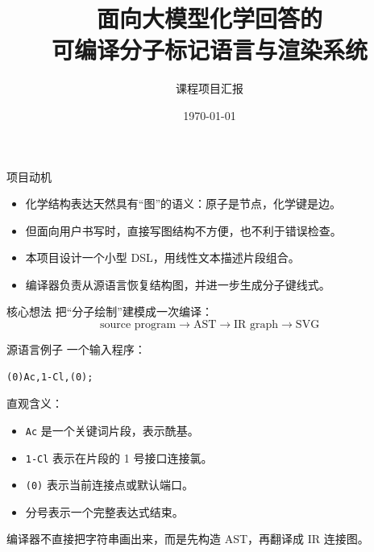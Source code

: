 \documentclass{beamer}
\title{面向大模型化学回答的\\可编译分子标记语言与渲染系统}
\author{课程项目汇报}
\institute{Compiler Project}
\date{\today}
\begin{document}
\begin{frame}
    \titlepage
\end{frame}

\begin{frame}{项目动机}
    \begin{itemize}
        \item 化学结构表达天然具有“图”的语义：原子是节点，化学键是边。
        \item 但面向用户书写时，直接写图结构不方便，也不利于错误检查。
        \item 本项目设计一个小型 DSL，用线性文本描述片段组合。
        \item 编译器负责从源语言恢复结构图，并进一步生成分子键线式。
    \end{itemize}

    \vspace{0.5em}
    \begin{block}{核心想法}
        把“分子绘制”建模成一次编译：
        \[
            \text{source program} \rightarrow \text{AST} \rightarrow \text{IR graph} \rightarrow \text{SVG}
        \]
    \end{block}
\end{frame}

\begin{frame}[fragile]{源语言例子}
    一个输入程序：
    \begin{lstlisting}
(0)Ac,1-Cl,(0);
    \end{lstlisting}

    直观含义：
    \begin{itemize}
        \item \texttt{Ac} 是一个关键词片段，表示酰基。
        \item \texttt{1-Cl} 表示在片段的 1 号接口连接氯。
        \item \texttt{(0)} 表示当前连接点或默认端口。
        \item 分号表示一个完整表达式结束。
    \end{itemize}

    \vspace{0.4em}
    编译器不直接把字符串画出来，而是先构造 AST，再翻译成 IR 连接图。
\end{frame}
\end{document}
